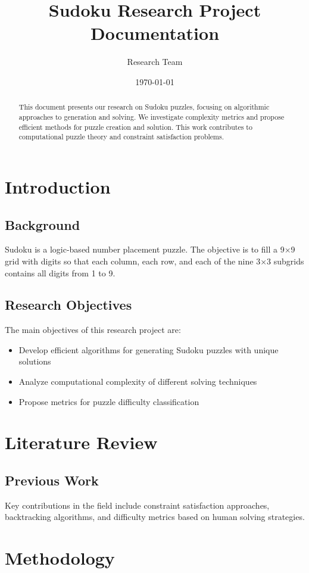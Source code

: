 \documentclass[12pt,a4paper]{article}
\title{Sudoku Research Project Documentation}
\author{Research Team}
\date{\today}
\begin{document}
\maketitle

\begin{abstract}
This document presents our research on Sudoku puzzles, focusing on algorithmic approaches to generation and solving. We investigate complexity metrics and propose efficient methods for puzzle creation and solution. This work contributes to computational puzzle theory and constraint satisfaction problems.
\end{abstract}

\section{Introduction}
\subsection{Background}
Sudoku is a logic-based number placement puzzle. The objective is to fill a 9×9 grid with digits so that each column, each row, and each of the nine 3×3 subgrids contains all digits from 1 to 9.

\subsection{Research Objectives}
The main objectives of this research project are:
\begin{itemize}
    \item Develop efficient algorithms for generating Sudoku puzzles with unique solutions
    \item Analyze computational complexity of different solving techniques
    \item Propose metrics for puzzle difficulty classification
\end{itemize}

\section{Literature Review}
\subsection{Previous Work}
Key contributions in the field include constraint satisfaction approaches, backtracking algorithms, and difficulty metrics based on human solving strategies.
\section{Methodology}
\end{document}
